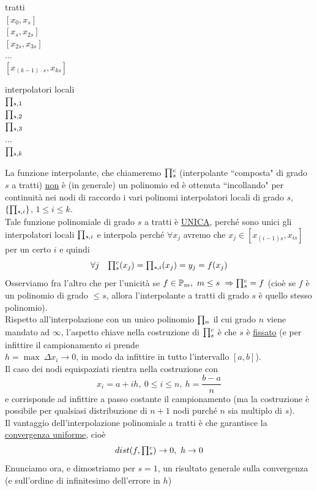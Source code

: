 \begin{minipage}{0.33\textwidth}
\begin{center}
    tratti\\
    $[x_0, x_s]$\\
    $[x_s, x_{2s}]$\\
    $[x_{2s}, x_{3s}]$\\
    $\dotso$\\
    $[x_{(k-1) \cdot s}, x_{ks}]$
\end{center}
\end{minipage}
\begin{minipage}{0.33\textwidth}
\begin{center}
    interpolatori locali\\
    $\begin{matrix}\prod\end{matrix}_{s,1}$\\
    $\begin{matrix}\prod\end{matrix}_{s,2}$\\
    $\begin{matrix}\prod\end{matrix}_{s,3}$\\
    $\dotso$\\
    $\begin{matrix}\prod\end{matrix}_{s,k}$
\end{center}
\end{minipage}

\bigskip
La funzione interpolante, che chiameremo $\begin{matrix}\prod\end{matrix}_s^c$ (interpolante ``composta" di grado $s$ a tratti) \uline{non} è (in generale) un polinomio ed è ottenuta ``incollando" per continuità nei nodi di raccordo i vari polinomi interpolatori locali di grado $s$, $\{ \begin{matrix}\prod\end{matrix}_{s, i}\}$, $1 \leq i \leq k$.\\
Tale funzione polinomiale di grado $s$ a tratti è \uline{UNICA}, perché sono unici gli interpolatori locali $\begin{matrix}\prod\end{matrix}_{s,i}$ e interpola perché $\forall x_j$ avremo che $x_j \in [x_{(i-1) s}, x_{i s}]$ per un certo $i$ e quindi
\[ \forall j \quad \begin{matrix}\prod\end{matrix}_s^c (x_j) = \begin{matrix}\prod\end{matrix}_{s,i} (x_j) = y_j = f(x_j) \]
Osserviamo fra l'altro che per l'unicità se $f \in \mathbb{P}_m, \ m \leq s \ \Rightarrow \begin{matrix}\prod\end{matrix}_s^c = f$ (cioè se $f$ è un polinomio di grado $\leq s$, allora l'interpolante a tratti di grado $s$ è quello stesso polinomio).\\
Rispetto all'interpolazione con un unico polinomio $\begin{matrix}\prod\end{matrix}_n$ il cui grado $n$ viene mandato ad $\infty$, l'aspetto chiave nella costruzione di $\begin{matrix}\prod\end{matrix}_s^c$ è che $s$ è \uline{fissato} (e per infittire il campionamento si prende\\
$h=\max \ \Delta x_i \to 0$, in modo da infittire in tutto l'intervallo $[a,b]$).\\
Il caso dei nodi equispaziati rientra nella costruzione con
\[ x_i = a+ih, \ 0 \leq i \leq n, \ h = \frac{b-a}{n} \]
e corrisponde ad infittire a passo costante il campionamento (ma la costruzione è possibile per qualsiasi distribuzione di $n+1$ nodi purché $n$ sia multiplo di $s$).\\
Il vantaggio dell'interpolazione polinomiale a tratti è che garantisce la \uline{convergenza uniforme}, cioè 
\[ dist(f, \begin{matrix}\prod\end{matrix}_{s}^{c}) \to 0, \ h \to 0 \]
Enunciamo ora, e dimostriamo per $s=1$, un risultato generale sulla convergenza (e sull'ordine
di infinitesimo dell'errore in $h$)

